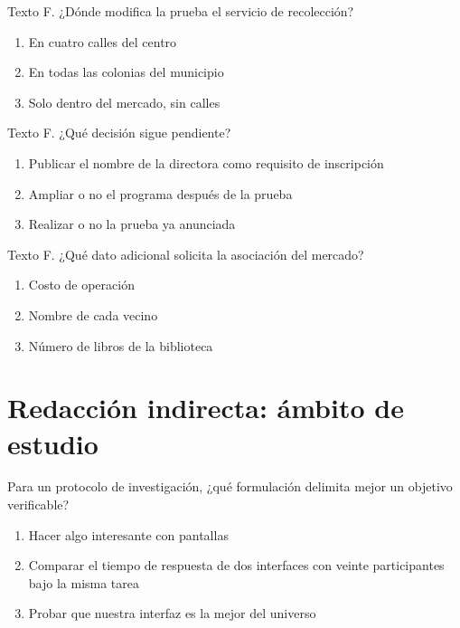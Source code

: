 \noindent\begin{minipage}{\linewidth}\setlength{\parskip}{4pt}\label{q:L-028}
Texto F. ¿Dónde modifica la prueba el servicio de recolección?
\begin{enumerate}[label=\Alph*),nosep]
\item En cuatro calles del centro
\item En todas las colonias del municipio
\item Solo dentro del mercado, sin calles
\end{enumerate}\end{minipage}\par\medskip

\noindent\begin{minipage}{\linewidth}\setlength{\parskip}{4pt}\label{q:L-029}
Texto F. ¿Qué decisión sigue pendiente?
\begin{enumerate}[label=\Alph*),nosep]
\item Publicar el nombre de la directora como requisito de inscripción
\item Ampliar o no el programa después de la prueba
\item Realizar o no la prueba ya anunciada
\end{enumerate}\end{minipage}\par\medskip

\noindent\begin{minipage}{\linewidth}\setlength{\parskip}{4pt}\label{q:L-030}
Texto F. ¿Qué dato adicional solicita la asociación del mercado?
\begin{enumerate}[label=\Alph*),nosep]
\item Costo de operación
\item Nombre de cada vecino
\item Número de libros de la biblioteca
\end{enumerate}\end{minipage}\par\medskip

\section{Redacción indirecta: ámbito de estudio}

\noindent\begin{minipage}{\linewidth}\setlength{\parskip}{4pt}\label{q:E-001}
Para un protocolo de investigación, ¿qué formulación delimita mejor un objetivo verificable?
\begin{enumerate}[label=\Alph*),nosep]
\item Hacer algo interesante con pantallas
\item Comparar el tiempo de respuesta de dos interfaces con veinte participantes bajo la misma tarea
\item Probar que nuestra interfaz es la mejor del universo
\end{enumerate}\end{minipage}\par\medskip

